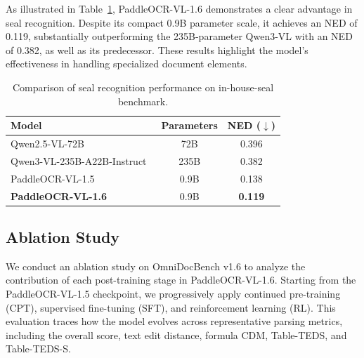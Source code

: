 \documentclass[11pt, a4paper,logo,  copyright, nonumbering]{paddleocr}
\begin{document}
As illustrated in Table~\ref{table:seal_results}, PaddleOCR-VL-1.6 demonstrates a clear advantage in seal recognition. Despite its compact 0.9B parameter scale, it achieves an NED of 0.119, substantially outperforming the 235B-parameter Qwen3-VL with an NED of 0.382, as well as its predecessor. These results highlight the model's effectiveness in handling specialized document elements.

\begin{table}[ht]
\centering
 \fontsize{8}{8}\selectfont
\renewcommand{\arraystretch}{1.2}

\begin{tabular}{l|c|c}
\toprule
\textbf{Model} & \textbf{Parameters} & \textbf{NED ($\downarrow$)} \\ 
\midrule
Qwen2.5-VL-72B~\cite{bai2025qwen2} & 72B & 0.396 \\
Qwen3-VL-235B-A22B-Instruct~\cite{yang2025qwen3} & 235B & 0.382 \\ 
PaddleOCR-VL-1.5~\cite{cui2026paddleocrvl15multitask09bvlm} & 0.9B & 0.138 \\
\textbf{PaddleOCR-VL-1.6} & 0.9B & \cellcolor{red!15}\textbf{0.119} \\ 
\bottomrule
\end{tabular}
\caption{Comparison of seal recognition performance on in-house-seal benchmark.}
\label{table:seal_results}
\end{table}


\subsection{Ablation Study}

We conduct an ablation study on OmniDocBench v1.6 to analyze the contribution of each post-training stage in PaddleOCR-VL-1.6. Starting from the PaddleOCR-VL-1.5 checkpoint, we progressively apply continued pre-training (CPT), supervised fine-tuning (SFT), and reinforcement learning (RL). This evaluation traces how the model evolves across representative parsing metrics, including the overall score, text edit distance, formula CDM, Table-TEDS, and Table-TEDS-S. 
\end{document}
